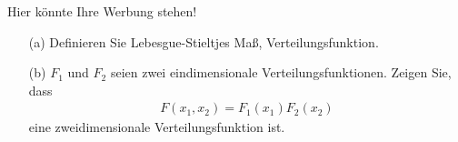 \begin{exercise}

Hier könnte Ihre Werbung stehen!

\begin{itemize}
  \item[(a)] Definieren Sie Lebesgue-Stieltjes Maß, Verteilungsfunktion.
  \item[(b)] $F_1$ und $F_2$ seien zwei eindimensionale Verteilungsfunktionen. Zeigen Sie, dass
  \begin{align*}
    F(x_1, x_2) = F_1(x_1) F_2(x_2)
  \end{align*}
  eine zweidimensionale Verteilungsfunktion ist.
\end{itemize}

\end{exercise}


